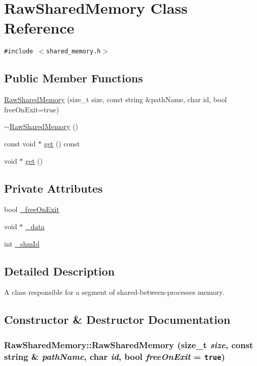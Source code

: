 \hypertarget{classRawSharedMemory}{
\section{RawSharedMemory Class Reference}
\label{classRawSharedMemory}
}
{\tt \#include $<$shared\_\-memory.h$>$}

\subsection*{Public Member Functions}
\begin{CompactItemize}
\item 
\hyperlink{classRawSharedMemory_718ffde99de132b4a9d2a0b6760c604c}{RawSharedMemory} (size\_\-t size, const string \&pathName, char id, bool freeOnExit=true)
\item 
\hyperlink{classRawSharedMemory_dd28221a9455cb3ead6798e131f02fb9}{$\sim$RawSharedMemory} ()
\item 
const void $\ast$ \hyperlink{classRawSharedMemory_69f70452c4f5d70329cf93ae41ce9614}{get} () const 
\item 
void $\ast$ \hyperlink{classRawSharedMemory_34c5400cb6f69492c9cb03294ba2323f}{get} ()
\end{CompactItemize}
\subsection*{Private Attributes}
\begin{CompactItemize}
\item 
bool \hyperlink{classRawSharedMemory_a8c93446e3de31c2f6b683f0a3404358}{\_\-freeOnExit}
\item 
void $\ast$ \hyperlink{classRawSharedMemory_6edaf44782a9f1ddee877875a6cc786e}{\_\-data}
\item 
int \hyperlink{classRawSharedMemory_b950192a915183bb279f2855f6b0114c}{\_\-shmId}
\end{CompactItemize}


\subsection{Detailed Description}
A class responsible for a segment of shared-between-processes memory. 

\subsection{Constructor \& Destructor Documentation}
\hypertarget{classRawSharedMemory_718ffde99de132b4a9d2a0b6760c604c}{
\subsubsection[{RawSharedMemory}]{\setlength{\rightskip}{0pt plus 5cm}RawSharedMemory::RawSharedMemory (size\_\-t {\em size}, \/  const string \& {\em pathName}, \/  char {\em id}, \/  bool {\em freeOnExit} = {\tt true})}}
\label{classRawSharedMemory_718ffde99de132b4a9d2a0b6760c604c}


